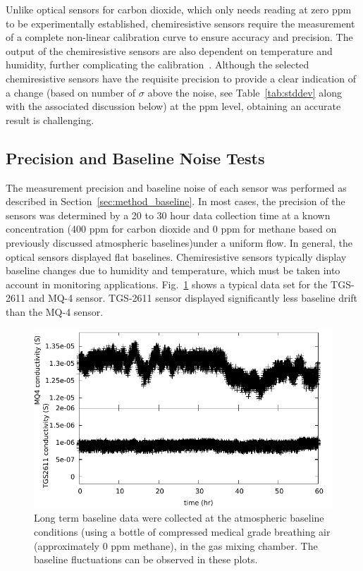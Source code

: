 \documentclass[preprint,sort&compress]{elsarticle}
\begin{document}
			Unlike optical sensors for carbon dioxide, which only needs reading at zero ppm to be experimentally established, chemiresistive sensors require the measurement of a complete non-linear calibration curve to ensure accuracy and precision.
			The output of the chemiresistive sensors are also dependent on temperature and humidity, further complicating the calibration~\cite{benkstein_analytical_2014}.
			Although the selected chemiresistive sensors have the requisite precision to provide a clear indication of a change (based on number of $\sigma$ above the noise, see Table~\ref{tab:stddev} along with the associated discussion below) at the ppm level, obtaining an accurate result is challenging.
			

		\subsection{Precision and Baseline Noise Tests}
			\label{sec:main_baseline}
			
			The measurement precision and baseline noise of each sensor was performed as described in Section~\ref{sec:method_baseline}.
			In most cases, the precision of the sensors was determined by a 20 to 30 hour data collection time at a known concentration (400 ppm for carbon dioxide and 0 ppm for methane based on previously discussed atmospheric baselines)under a uniform flow.
			In general, the optical sensors displayed flat baselines. Chemiresistive sensors typically display baseline changes due to humidity and temperature, which must be taken into account in monitoring applications. Fig.~\ref{fig:MQ4TGSbaseline} shows a typical data set for the TGS-2611 and MQ-4 sensor.
			TGS-2611 sensor displayed significantly less baseline drift than the MQ-4 sensor.
			
			
			\begin{figure}[!t]
				\centering
				\includegraphics[width=\columnwidth]{honey5.pdf}
				\caption{Long term baseline data were collected at the atmospheric baseline conditions (using a bottle of compressed medical grade breathing air (approximately 0 ppm methane), in the gas mixing chamber.
				The baseline fluctuations can be observed in these plots.}
				\label{fig:MQ4TGSbaseline}
			\end{figure}
			
\end{document}
